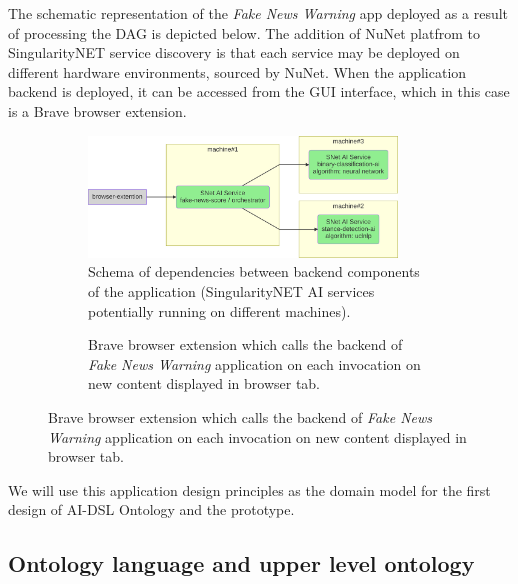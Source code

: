 \documentclass[]{report}
\begin{document}
The schematic representation of the \textit{Fake News Warning} app deployed as a
result of processing the DAG is depicted below. The addition of NuNet platfrom
to SingularityNET service discovery is that each service may be deployed on
different hardware environments, sourced by NuNet. When the application backend
is deployed, it can be accessed from the GUI interface, which in this case is a
Brave browser extension.

\begin{figure}[H]
  \begin{subfigure}[b]{0.50\textwidth}
    \centering
    \includegraphics[width=0.9\textwidth]{../../../ontology/images/fake_news_detector.png}
    \captionsetup{width=0.8\linewidth}
    \caption{Schema of dependencies between backend components of the application
    (SingularityNET AI services potentially running on different machines).}
    \label{fig:fake_news_detector_schema}
  \end{subfigure}
  \begin{subfigure}[b]{0.50\textwidth}
    \centering
    \captionsetup{width=0.8\linewidth}
    \caption{Brave browser extension which calls the backend of
    \textit{Fake News Warning} application on each invocation on new
    content displayed in browser tab.}
  \end{subfigure}
\end{figure}

We will use this application design principles as the domain model for the first
design of AI-DSL Ontology and the prototype.

\subsection{Ontology language and upper level ontology}
\end{document}
